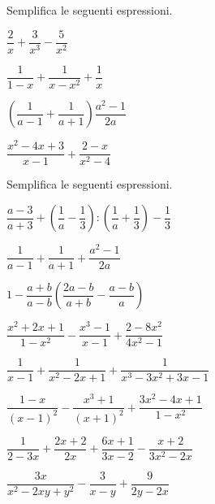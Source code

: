 \begin{esercizio}[*]
\label{ese:19.31}
Semplifica le seguenti espressioni.
\begin{htmulticols}{2}
\begin{enumeratea}
\item \(\dfrac{2}{x}+\dfrac{3}{x^{3}}-\dfrac{5}{x^{2}}\)
\item \(\dfrac{1}{1-x}+\dfrac{1}{x-x^{2}}+\dfrac{1}{x}\)
\item \(\left(\dfrac{1}{a-1}+\dfrac{1}{a+1}\right)\dfrac{a^{2}-1}{2a}\)
\item \(\dfrac{x^{2}\!-\!4x\!+\!3}{x-1}+\dfrac{2\!-\!x}{x^{2}\!-\!4}\)
\end{enumeratea}
\end{htmulticols}
\end{esercizio}

\begin{esercizio}[*]
Semplifica le seguenti espressioni.
\begin{enumeratea}
\item \(\dfrac{a-3}{a+3}+\left(\dfrac{1}{a}-\dfrac{1}{3}\right):
\left(\dfrac{1}{a}+\dfrac{1}{3}\right)-\dfrac{1}{3}\)
\item \(\dfrac{1}{a-1}+\dfrac{1}{a+1}+\dfrac{a^{2}-1}{2a}\)
\item \(1-\dfrac{a+b}{a-b} \left(\dfrac{2a-b}{a+b}-\dfrac{a-b}{a}\right)\)
\item \(\dfrac{x^{2}+2x+1}{1-x^{2}}-\dfrac{x^{3}-1}{x-1}+
\dfrac{2-8x^{2}}{4x^{2}-1}\)
\item \(\dfrac{1}{x-1}+\dfrac{1}{x^{2}-2x+1}+\dfrac{1}{x^{3}-3x^{2}+3x-1}\)
\item \(\dfrac{1-x}{(x-1)^{2}}-\dfrac{x^{3}+1}{(x+1)^{2}}+
\dfrac{3x^{2}-4x+1}{1-x^{2}}\)
\item \(\dfrac{1}{2-3x}+\dfrac{2x+2}{2x}+\dfrac{6x+1}{3x-2}-
\dfrac{x+2}{3x^{2}-2x}\)
\item \(\dfrac{3x}{x^{2}-2xy+y^{2}}-\dfrac{3}{x-y}+\dfrac{9}{2y-2x}\)
\end{enumeratea}
\end{esercizio}

